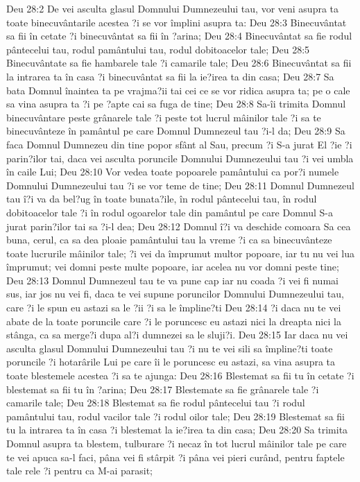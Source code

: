 Deu 28:2  De vei asculta glasul Domnului Dumnezeului tau, vor veni asupra ta toate binecuvântarile acestea ?i se vor împlini asupra ta:
Deu 28:3  Binecuvântat sa fii în cetate ?i binecuvântat sa fii în ?arina;
Deu 28:4  Binecuvântat sa fie rodul pântecelui tau, rodul pamântului tau, rodul dobitoacelor tale;
Deu 28:5  Binecuvântate sa fie hambarele tale ?i camarile tale;
Deu 28:6  Binecuvântat sa fii la intrarea ta în casa ?i binecuvântat sa fii la ie?irea ta din casa;
Deu 28:7  Sa bata Domnul înaintea ta pe vrajma?ii tai cei ce se vor ridica asupra ta; pe o cale sa vina asupra ta ?i pe ?apte cai sa fuga de tine;
Deu 28:8  Sa-îi trimita Domnul binecuvântare peste grânarele tale ?i peste tot lucrul mâinilor tale ?i sa te binecuvânteze în pamântul pe care Domnul Dumnezeul tau ?i-l da;
Deu 28:9  Sa faca Domnul Dumnezeu din tine popor sfânt al Sau, precum ?i S-a jurat El ?ie ?i parin?ilor tai, daca vei asculta poruncile Domnului Dumnezeului tau ?i vei umbla în caile Lui;
Deu 28:10  Vor vedea toate popoarele pamântului ca por?i numele Domnului Dumnezeului tau ?i se vor teme de tine;
Deu 28:11  Domnul Dumnezeul tau î?i va da bel?ug în toate bunata?ile, în rodul pântecelui tau, în rodul dobitoacelor tale ?i în rodul ogoarelor tale din pamântul pe care Domnul S-a jurat parin?ilor tai sa ?i-l dea;
Deu 28:12  Domnul î?i va deschide comoara Sa cea buna, cerul, ca sa dea ploaie pamântului tau la vreme ?i ca sa binecuvânteze toate lucrurile mâinilor tale; ?i vei da împrumut multor popoare, iar tu nu vei lua împrumut; vei domni peste multe popoare, iar acelea nu vor domni peste tine;
Deu 28:13  Domnul Dumnezeul tau te va pune cap iar nu coada ?i vei fi numai sus, iar jos nu vei fi, daca te vei supune poruncilor Domnului Dumnezeului tau, care ?i le spun eu astazi sa le ?ii ?i sa le împline?ti
Deu 28:14  ?i daca nu te vei abate de la toate poruncile care ?i le poruncesc eu astazi nici la dreapta nici la stânga, ca sa merge?i dupa al?i dumnezei sa le sluji?i.
Deu 28:15  Iar daca nu vei asculta glasul Domnului Dumnezeului tau ?i nu te vei sili sa împline?ti toate poruncile ?i hotarârile Lui pe care îi le poruncesc eu astazi, sa vina asupra ta toate blestemele acestea ?i sa te ajunga:
Deu 28:16  Blestemat sa fii tu în cetate ?i blestemat sa fii tu în ?arina;
Deu 28:17  Blestemate sa fie grânarele tale ?i camarile tale;
Deu 28:18  Blestemat sa fie rodul pântecelui tau ?i rodul pamântului tau, rodul vacilor tale ?i rodul oilor tale;
Deu 28:19  Blestemat sa fii tu la intrarea ta în casa ?i blestemat la ie?irea ta din casa;
Deu 28:20  Sa trimita Domnul asupra ta blestem, tulburare ?i necaz în tot lucrul mâinilor tale pe care te vei apuca sa-l faci, pâna vei fi stârpit ?i pâna vei pieri curând, pentru faptele tale rele ?i pentru ca M-ai parasit;

